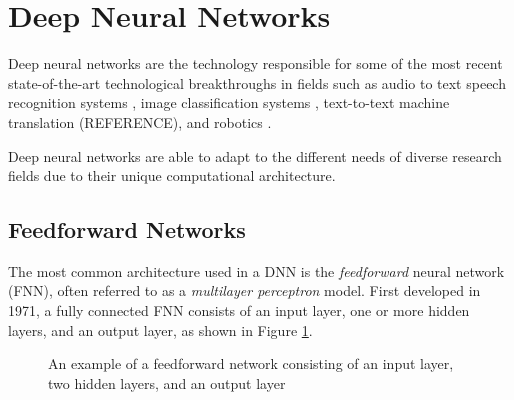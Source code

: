\section{Deep Neural Networks}\label{sec:deep_neural_networks}
Deep neural networks are the technology responsible for some of the most recent state-of-the-art technological breakthroughs in fields such as audio to text speech recognition systems \cite{Hinton2012}, image classification systems \cite{Krizhevsky2012, Simonyan2014, Szegedy2015, He2016}, text-to-text machine translation (REFERENCE), and robotics \cite{Mnih2015, Lillicrap2015, Schulman2015, Schulman2015highdimensional}.

Deep neural networks are able to adapt to the different needs of diverse research fields due to their unique computational architecture.




\subsection{Feedforward Networks}\label{sec:feedfoorward_networks}
The most common architecture used in a DNN is the \textit{feedforward} neural network (FNN), often referred to as a \textit{multilayer perceptron} model. First developed in 1971, a fully connected FNN consists of an input layer, one or more hidden layers, and an output layer, as shown in Figure \ref{fig:2302_feedforward_network}.

\begin{figure}[h]
	\centering
	
	\caption[Feedforward network example]{An example of a feedforward network consisting of an input layer, two hidden layers, and an output layer}
	\label{fig:2302_feedforward_network}
\end{figure}

